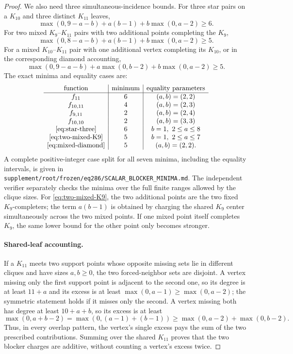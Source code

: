 \begin{proof}
We also need three simultaneous-incidence bounds. For three star pairs on a $K_{10}$ and three distinct $K_{11}$ leaves,
\begin{equation}
\max(0,9-a-b)+a(b-1)+b\max(0,a-2)\geq6.
\label{eq:star-three}
\end{equation}
For two mixed $K_9$--$K_{11}$ pairs with two additional points completing the $K_9$,
\begin{equation}
\max(0,8-a-b)+a(b-1)+b\max(0,a-2)\geq5.
\label{eq:two-mixed-K9}
\end{equation}
For a mixed $K_{10}$--$K_{11}$ pair with one additional vertex completing its $K_{10}$, or in the corresponding diamond accounting,
\begin{equation}
\max(0,9-a-b)+a\max(0,b-2)+b\max(0,a-2)\geq5.
\label{eq:mixed-diamond}
\end{equation}
The exact minima and equality cases are:
\[
\begin{array}{c|c|c}
\text{function}&\text{minimum}&\text{equality parameters}\\ \hline
f_{11}&6&(a,b)=(2,2)\\
f_{10,11}&4&(a,b)=(2,3)\\
f_{9,11}&2&(a,b)=(2,4)\\
f_{10,10}&2&(a,b)=(3,3)\\
\eqref{eq:star-three}&6&b=1,\ 2\leq a\leq8\\
\eqref{eq:two-mixed-K9}&5&b=1,\ 2\leq a\leq7\\
\eqref{eq:mixed-diamond}&5&(a,b)=(2,2).
\end{array}
\]
A complete positive-integer case split for all seven minima, including the equality intervals, is given in \texttt{supplement/root/frozen/eq286/SCALAR\_BLOCKER\_MINIMA.md}. The independent verifier separately checks the minima over the full finite ranges allowed by the clique sizes. For \eqref{eq:two-mixed-K9}, the two additional points are the two fixed $K_9$-completers; the term $a(b-1)$ is obtained by charging the shared $K_9$ center simultaneously across the two mixed points. If one mixed point itself completes $K_9$, the same lower bound for the other point only becomes stronger.

\paragraph{Shared-leaf accounting.}
If a $K_{11}$ meets two support points whose opposite missing sets lie in different cliques and have sizes $a,b\geq0$, the two forced-neighbor sets are disjoint. A vertex missing only the first support point is adjacent to the second one, so its degree is at least $11+a$ and its excess is at least $\max(0,a-1)\geq\max(0,a-2)$; the symmetric statement holds if it misses only the second. A vertex missing both has degree at least $10+a+b$, so its excess is at least
\[
\max(0,a+b-2)=\max(0,(a-1)+(b-1))
\geq\max(0,a-2)+\max(0,b-2).
\]
Thus, in every overlap pattern, the vertex's single excess pays the sum of the two prescribed contributions. Summing over the shared $K_{11}$ proves that the two blocker charges are additive, without counting a vertex's excess twice.


\end{proof}
